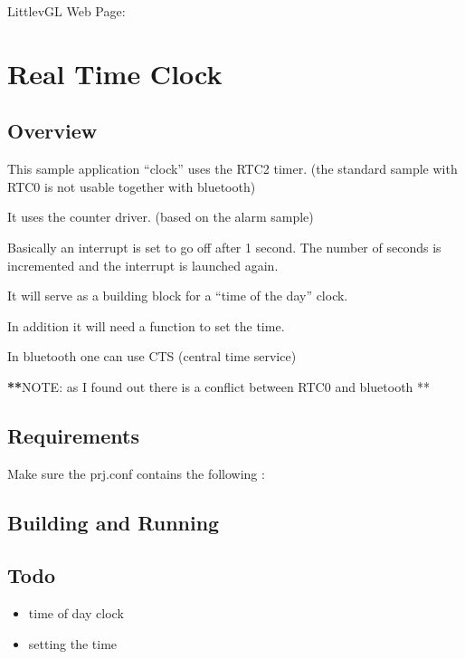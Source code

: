 \documentclass[letterpaper,10pt,english]{sphinxmanual}
\begin{document}
LittlevGL Web Page: 


\chapter{Real Time Clock}
\label{\detokenize{RTC:real-time-clock}}\label{\detokenize{RTC:rtc}}\label{\detokenize{RTC::doc}}

\section{Overview}
\label{\detokenize{RTC:overview}}
This sample application “clock” uses the RTC2 timer.
(the standard sample with RTC0 is not usable together with bluetooth)

It uses the counter driver. (based on the alarm sample)

Basically an interrupt is set to go off after 1 second.
The number of seconds is incremented and the interrupt is launched again.

It will serve as a building block for a “time of the day” clock.

In addition it will need a function to set the time.

In bluetooth one can use CTS (central time service)

{\color{red}\bfseries{}**}NOTE: as I found out there is a conflict between RTC0 and bluetooth **


\section{Requirements}
\label{\detokenize{RTC:requirements}}
Make sure the prj.conf contains the following :

\begin{sphinxVerbatim}[commandchars=\\\{\}]
\end{sphinxVerbatim}


\section{Building and Running}
\label{\detokenize{RTC:building-and-running}}

\section{Todo}
\label{\detokenize{RTC:todo}}\begin{itemize}
\item {} 
time of day clock

\item {} 
setting the time

\end{itemize}
\end{document}
